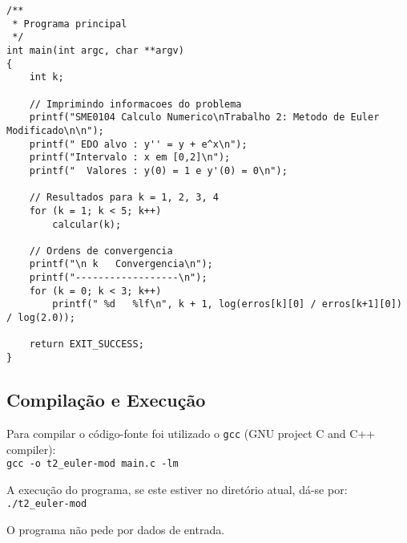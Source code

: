 \begin{lstlisting}
/**
 * Programa principal
 */
int main(int argc, char **argv)
{
	int k;
	
	// Imprimindo informacoes do problema
	printf("SME0104 Calculo Numerico\nTrabalho 2: Metodo de Euler Modificado\n\n");
	printf(" EDO alvo : y'' = y + e^x\n");
	printf("Intervalo : x em [0,2]\n");
	printf("  Valores : y(0) = 1 e y'(0) = 0\n");
	
	// Resultados para k = 1, 2, 3, 4
	for (k = 1; k < 5; k++)
		calcular(k);
	
	// Ordens de convergencia
	printf("\n k   Convergencia\n");
	printf("------------------\n");
	for (k = 0; k < 3; k++)
		printf(" %d   %lf\n", k + 1, log(erros[k][0] / erros[k+1][0]) / log(2.0));

	return EXIT_SUCCESS;
}
\end{lstlisting}

\subsection{Compilação e Execução}

Para compilar o código-fonte foi utilizado o \texttt{gcc} (GNU project C and C++ compiler):\\
\indent\verb|gcc -o t2_euler-mod main.c -lm|

A execução do programa, se este estiver no diretório atual, dá-se por:\\
\indent\verb|./t2_euler-mod|

O programa não pede por dados de entrada.

\newpage
